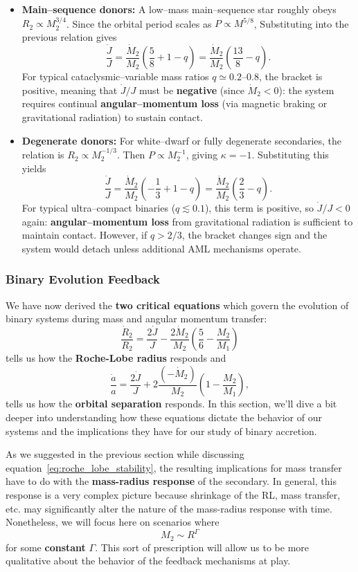 \begin{itemize}
    \item \textbf{Main--sequence donors:}  
    A low--mass main--sequence star roughly obeys $R_2 \propto M_2^{3/4}$.  Since the orbital period scales as $P \propto M^{5/8}$, Substituting into the previous relation gives
    \[
    \boxed{\frac{\dot{J}}{J} = \frac{\dot{M}_2}{M_2}\left(\frac{5}{8} + 1 - q\right)
    = \frac{\dot{M}_2}{M_2}\left(\frac{13}{8} - q\right).}
    \]
    For typical cataclysmic--variable mass ratios $q \simeq 0.2$--$0.8$, the bracket is positive, 
    meaning that $\dot{J}/J$ must be \textbf{negative} (since $\dot{M}_2 < 0$):  
    the system requires continual \textbf{angular--momentum loss} (via magnetic braking or gravitational radiation) to sustain contact.

    \item \textbf{Degenerate donors:}  
    For white--dwarf or fully degenerate secondaries, the relation is $R_2 \propto M_2^{-1/3}$.  
    Then $P \propto M_2^{-1}$, giving $\kappa = -1$.  
    Substituting this yields
    \[
    \boxed{\frac{\dot{J}}{J} = \frac{\dot{M}_2}{M_2}\left(-\frac{1}{3} + 1 - q\right)
    = \frac{\dot{M}_2}{M_2}\left(\frac{2}{3} - q\right).}
    \]
    For typical ultra--compact binaries ($q \lesssim 0.1$), this term is positive, so $\dot{J}/J < 0$ again: 
    \textbf{angular--momentum loss} from gravitational radiation is sufficient to maintain contact.  
    However, if $q > 2/3$, the bracket changes sign and the system would detach unless additional AML mechanisms operate.
\end{itemize}

\subsubsection{Binary Evolution Feedback}

We have now derived the \textbf{two critical equations} which govern the evolution of binary systems during mass and angular momentum transfer:
\[
    \frac{\dot{R}_2}{R_2} = \frac{2\dot{J}}{J} - \frac{2\dot{M}_2}{M_2}\left(\frac{5}{6}-\frac{M_2}{M_1}\right)
\]
tells us how the \textbf{Roche-Lobe radius} responds and
\[
\frac{\dot{a}}{a} = \frac{2\dot{J}}{J}
    + 2\frac{(-\dot{M}_2)}{M_2}\left(1 - \frac{M_2}{M_1}\right),
\]
tells us how the \textbf{orbital separation} responds. In this section, we'll dive a bit deeper into understanding how these equations dictate the behavior of our systems and the implications they have for our study of binary accretion.
\par
As we suggested in the previous section while discussing equation~\eqref{eq:roche_lobe_stability}, the resulting implications for mass transfer have to do with the \textbf{mass-radius response} of the secondary. In general, this response is a very complex picture because shrinkage of the RL, mass transfer, etc. may significantly alter the nature of the mass-radius response with time. Nonetheless, we will focus here on scenarios where 
\[
M_2 \sim R^\Gamma
\]
for some \textbf{constant} $\Gamma$. This sort of prescription will allow us to be more qualitative about the behavior of the feedback mechanisms at play.

